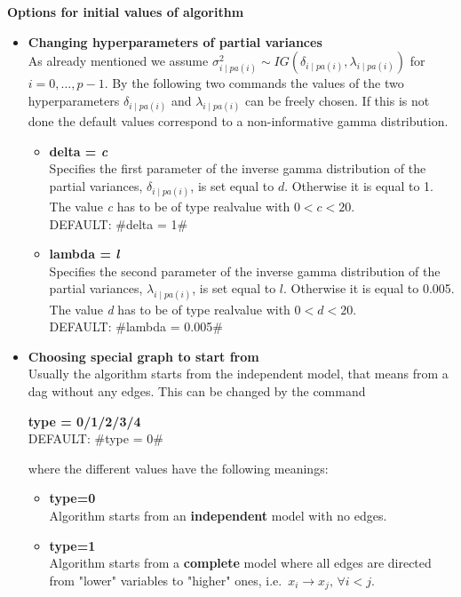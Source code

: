 {\bf Options for initial values of algorithm}
\begin{itemize}
\item {\bf Changing hyperparameters of partial variances} \\
As already mentioned we assume $\sigma_{i \mid pa(i)}^2 \sim IG
(\delta_{i \mid pa(i)},\lambda_{i \mid pa(i)} )$ for $i=0, \dots,
p-1$. By the following two commands the values of the two
hyperparameters $\delta_{i \mid pa(i)}$ and $\lambda_{i \mid
pa(i)}$ can be freely chosen. If this is not done the default
values correspond to a non-informative gamma distribution.
\begin{itemize}
\item {\bf delta =  {\em c} } \\
    Specifies the first parameter of the inverse gamma distribution of the partial
    variances, $\delta_{i \mid pa(i)}$, is set equal to $d$. Otherwise it is equal to 1. The value
    {\em c} has to be of type realvalue with $0< c<20$.\\
    DEFAULT: #delta =  1#
\item {\bf lambda =  {\em l} } \\
    Specifies the second parameter of the inverse gamma distribution of the partial
    variances, $\lambda_{i \mid pa(i)}$, is set equal to $l$. Otherwise it is equal to 0.005.
    The value {\em d} has to be of type realvalue with $0< d <20$.\\
    DEFAULT: #lambda = 0.005#
\end{itemize}
\item {\bf Choosing special graph to start from} \\
Usually the algorithm starts from the independent model, that
means from a dag without any edges. This can be changed by the
command
\begin{center}
{\bf type = 0/1/2/3/4}\\
DEFAULT: #type = 0#
\end{center}
where the different values have the following meanings:
\begin{itemize}
\item  {\bf type=0} \\
    Algorithm starts from an {\bf independent} model with no edges.
\item  {\bf type=1} \\
    Algorithm starts from a {\bf complete} model where all edges are directed
    from "lower" variables to "higher" ones, i.e.~$x_i \rightarrow x_j, \, \forall i<j$.

\end{itemize}
\end{itemize}
